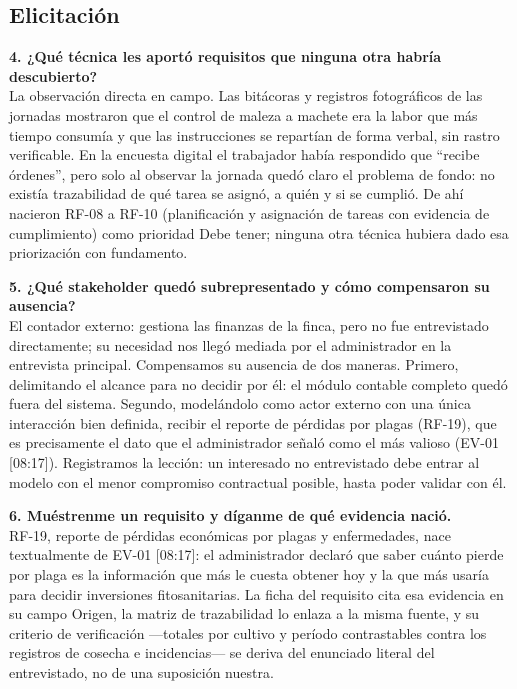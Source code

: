 \subsection*{Elicitación}

\noindent\textbf{4. ¿Qué técnica les aportó requisitos que ninguna otra habría descubierto?}\\
La observación directa en campo. Las bitácoras y registros fotográficos de las jornadas mostraron que el control de maleza a machete era la labor que más tiempo consumía y que las instrucciones se repartían de forma verbal, sin rastro verificable. En la encuesta digital el trabajador había respondido que ``recibe órdenes'', pero solo al observar la jornada quedó claro el problema de fondo: no existía trazabilidad de qué tarea se asignó, a quién y si se cumplió. De ahí nacieron RF-08 a RF-10 (planificación y asignación de tareas con evidencia de cumplimiento) como prioridad Debe tener; ninguna otra técnica hubiera dado esa priorización con fundamento.

\medskip
\noindent\textbf{5. ¿Qué stakeholder quedó subrepresentado y cómo compensaron su ausencia?}\\
El contador externo: gestiona las finanzas de la finca, pero no fue entrevistado directamente; su necesidad nos llegó mediada por el administrador en la entrevista principal. Compensamos su ausencia de dos maneras. Primero, delimitando el alcance para no decidir por él: el módulo contable completo quedó fuera del sistema. Segundo, modelándolo como actor externo con una única interacción bien definida, recibir el reporte de pérdidas por plagas (RF-19), que es precisamente el dato que el administrador señaló como el más valioso (EV-01 [08:17]). Registramos la lección: un interesado no entrevistado debe entrar al modelo con el menor compromiso contractual posible, hasta poder validar con él.

\medskip
\noindent\textbf{6. Muéstrenme un requisito y díganme de qué evidencia nació.}\\
RF-19, reporte de pérdidas económicas por plagas y enfermedades, nace textualmente de EV-01 [08:17]: el administrador declaró que saber cuánto pierde por plaga es la información que más le cuesta obtener hoy y la que más usaría para decidir inversiones fitosanitarias. La ficha del requisito cita esa evidencia en su campo Origen, la matriz de trazabilidad lo enlaza a la misma fuente, y su criterio de verificación ---totales por cultivo y período contrastables contra los registros de cosecha e incidencias--- se deriva del enunciado literal del entrevistado, no de una suposición nuestra.

